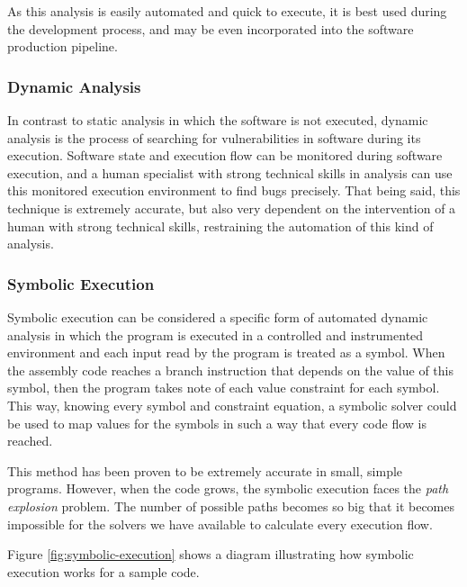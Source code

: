 As this analysis is easily automated and quick to execute, it is best used during the development process, and may be even incorporated into the software production pipeline.

\subsubsection{Dynamic Analysis}

In contrast to static analysis in which the software is not executed, dynamic analysis is the process of searching for vulnerabilities in software during its execution. Software state and execution flow can be monitored during software execution, and a human specialist with strong technical skills in analysis can use this monitored execution environment to find bugs precisely. That being said, this technique is extremely accurate, but also very dependent on the intervention of a human with strong technical skills, restraining the automation of this kind of analysis.

\subsubsection{Symbolic Execution}

Symbolic execution can be considered a specific form of automated dynamic analysis in which the program is executed in a controlled and instrumented environment and each input read by the program is treated as a symbol. When the assembly code reaches a branch instruction that depends on the value of this symbol, then the program takes note of each value constraint for each symbol. This way, knowing every symbol and constraint equation, a symbolic solver could be used to map values for the symbols in such a way that every code flow is reached.

This method has been proven to be extremely accurate in small, simple programs. However, when the code grows, the symbolic execution faces the \textit{path explosion} problem. The number of possible paths becomes so big that it becomes impossible for the solvers we have available to calculate every execution flow.

Figure \ref{fig:symbolic-execution} shows a diagram illustrating how symbolic execution works for a sample code.

